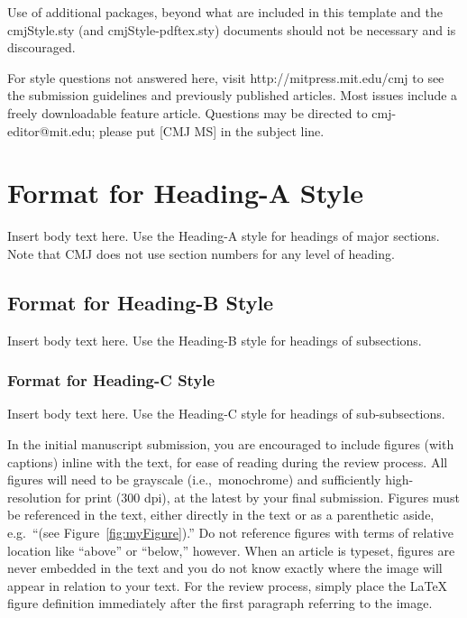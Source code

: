 \documentclass[letterpaper, 12pt]{article}
\begin{document}
Use of additional packages, beyond what are included in this template and the cmjStyle.sty (and cmjStyle-pdftex.sty) documents should not be necessary and is discouraged. 

For style questions not answered here, visit http://mitpress.mit.edu/cmj to see the submission guidelines and previously published articles.  
Most issues include a freely downloadable feature article.  
Questions may be directed to cmj-editor@mit.edu; please put [CMJ MS] in the subject line.

\parskip 18pt

%
\section{Format for Heading-A Style}

Insert body text here.  
Use the Heading-A style for headings of major sections.
Note that CMJ does not use section numbers for any level of heading.

\vspace*{24pt}

\subsection{Format for Heading-B Style}

Insert body text here.  
Use the Heading-B style for headings of subsections.

\subsubsection{Format for Heading-C Style}

Insert body text here.
Use the Heading-C style for headings of sub-subsections.

In the initial manuscript submission, you are encouraged to include figures (with captions) inline with the text, for ease of reading during the review process. 
All figures will need to be grayscale (i.e.,~monochrome) and sufficiently high-resolution for print (300 dpi), at the latest by your final submission.
Figures must be referenced in the text, either directly in the text or as a parenthetic aside, e.g.~``(see Figure~\ref{fig:myFigure}).''
Do not reference figures with terms of relative location like ``above'' or ``below,'' however.
When an article is typeset, figures are never embedded in the text and you do not know exactly where the image will appear in relation to your text.
For the review process, simply place the LaTeX figure definition immediately after the first paragraph referring to the image.
\end{document}
